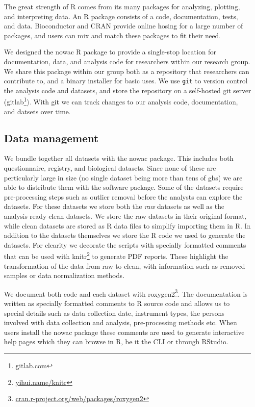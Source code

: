 The great strength of R comes from its many packages for analyzing, plotting,
and interpreting data. An R package consists of a code, documentation, tests,
and data. Bioconductor and CRAN provide online hosing for a large number of
packages, and users can mix and match these packages to fit their need. 

We designed the \gls{nowac} R package to provide a single-stop location for
documentation, data, and analysis code for researchers within our research
group. We share this package within our group both as a repository that
researchers can contribute to, and a binary installer for basic uses. 
We use \texttt{git} to version control the analysis code and datasets, and store
the repository on a self-hosted git server (gitlab\footnote{\url{gitlab.com}}).
With git we can track changes to our analysis code, documentation, and datsets
over time. 

\subsection{Data management} 
We bundle together all datasets with the \gls{nowac} package. This includes both
questionnaire, registry, and biological datasets. Since none of these are
perticularly large in size (no single dataset being more than tens of
\glspl{gb}) we are able to distribute them with the software package. Some of
the datasets require pre-processing steps such as outlier removal before the
analysts can explore the datasets. For these datasets we store both the
\emph{raw} datasets as well as the analysis-ready clean datasets. We store the
raw datasets in their original format, while clean datasets are stored as R data
files to simplify importing them in R. In addition to the datasets themselves we
store the R code we used to generate the datasets. For clearity we decorate the
scripts with specially formatted comments that can be used with
knitr\footnote{\url{yihui.name/knitr}} to generate PDF reports. These highlight
the transformation of the data from raw to clean, with information such as
removed samples or data normalization methods. 

We document both code and each dataset with
roxygen2\footnote{\url{cran.r-project.org/web/packages/roxygen2}}. The
documentation is written as specially formatted comments to R source code and
allows us to special details such as data collection date, instrument types, the
persons involved with data collection and analysis, pre-processing methods etc.
When users install the \gls{nowac} package these comments are used to generate
interactive help pages which they can browse in R, be it the CLI or through
RStudio. 

